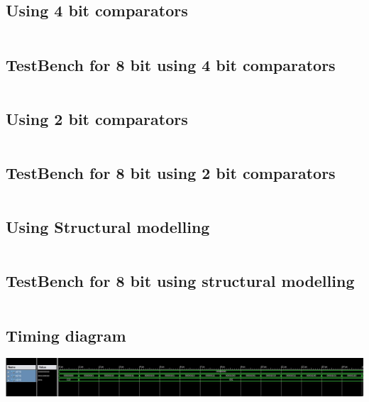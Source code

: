 \documentclass[titlepage]{article}
\begin{document}
        \subsection{Using 4 bit comparators}
        \inputminted{vhdl}{./codes/a5_3.vhd}
        \subsection{TestBench for 8 bit using 4 bit comparators}
        \inputminted{vhdl}{./codes/tb_a5_3.vhd}
        \subsection{Using 2 bit comparators}
        \inputminted{vhdl}{./codes/a4_4a.vhd}
        \subsection{TestBench for 8 bit using 2 bit comparators}
        \inputminted{vhdl}{./codes/tb_a4_4a.vhd}
        \subsection{Using Structural modelling}
        \inputminted{vhdl}{./codes/a5_4b.vhd}
        \subsection{TestBench for 8 bit using structural modelling}
        \inputminted{vhdl}{./codes/tb_a5_4b.vhd}
        \subsection{Timing diagram}
        \includegraphics[width=19cm]{./figures/8bit_td.jpeg}
\end{document}
